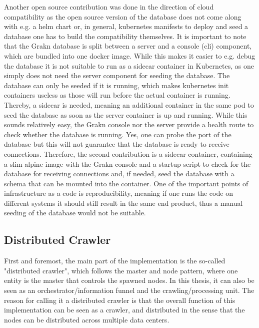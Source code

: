 Another open source contribution was done in the direction of cloud compatibility as the open source version of the database does not come along with e.g. a helm chart or, in general, kubernetes manifests to deploy and seed a database one has to build the compatibility themselves. It is important to note that the Grakn database is split between a server and a console (cli) component, which are bundled into one docker image. While this makes it easier to e.g. debug the database it is not suitable to run as a sidecar container in Kubernetes, as one simply does not need the server component for seeding the database. The database can only be seeded if it is running, which makes kubernetes init containers  useless as those will run before the actual container is running. Thereby, a sidecar is needed, meaning an additional container in the same pod to seed the database as soon as the server container is up and running. While this sounds relatively easy, the Grakn console nor the server provide a health route to check whether the database is running. Yes, one can probe the port of the database but this will not guarantee that the database is ready to receive connections. Therefore, the second contribution is a sidecar container, containing a slim alpine image with the Grakn console and a startup script to check for the database for receiving connections and, if needed, seed the database with a schema that can be mounted into the container.
One of the important points of infrastructure as a code is reproducibility, meaning if one runs the code on different systems it should still result in the same end product, thus a manual seeding of the database would not be suitable.

\subsection{Distributed Crawler}
First and foremost, the main part of the implementation is the so-called "distributed crawler", which follows the master and node pattern, where one entity is the master that controls the spawned nodes. In this thesis, it can also be seen as an orchestrator/information funnel and the crawling/processing unit. The reason for calling it a distributed crawler is that the overall function of this implementation can be seen as a crawler, and distributed in the sense that the nodes can be distributed across multiple data centers.

